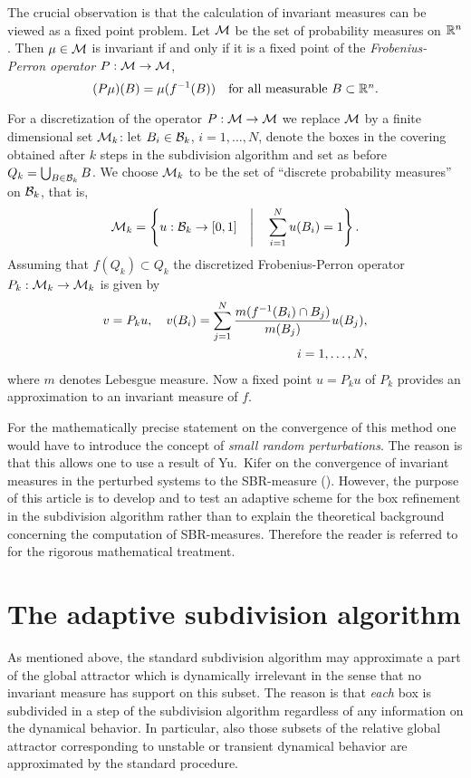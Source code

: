 \documentclass[cvs,envcountsect]{svjour}
\begin{document}
The crucial observation is that the calculation of
invariant measures can be viewed as a fixed point problem.
Let ${\cal M}$ be the set of probability measures on ${\mathbb R}^n$.
Then $\mu\in{\cal M}$ is invariant if and
only if it is a fixed point of the {\em Frobenius-Perron operator\/}
$P:{\cal M}\to {\cal M}$,
\begin{equation}
\label{eq:fp-fixed}
(P\mu)(B)=\mu(f^{-1}(B))\quad\mbox{for all measurable $B\subset{\mathbb R}^n$}.
\end{equation}

For a discretization of the operator $P:\cM\rightarrow\cM$ we
replace $\cM$ by a finite dimensional
set $\cM_k$: let $B_i\in\cB_k$, $i=1,\ldots,N$,
denote the boxes in the covering obtained after $k$ steps in the subdivision
algorithm and set as before $Q_k=\bigcup_{B\in\cB_k}B$.
We choose $\cM_k$ to be the set of ``discrete probability
measures'' on $\cB_k$, that is,
\[
\cM_k = \left\{ u:\cB_k\to [0,1] \quad\Bigg|
\quad \sum_{i=1}^N u(B_i)=1\right\}.
\]
Assuming that $f(Q_k)\subset Q_k$ the discretized
Frobenius-Perron operator $P_k:\cM_k\rightarrow\cM_k$ is given by
\begin{eqnarray}\label{eq:FP}
v= P_k u,\quad v(B_i)=\sum_{j=1}^N
\frac{m(f^{-1}(B_i)\cap B_j)}{m(B_j)}u(B_j),\\
\hfill i=1,\ldots,N,\nonumber
\end{eqnarray}
where $m$ denotes Lebesgue measure. Now a fixed point $u=P_k u$ of
$P_k$ provides an approximation to an invariant measure of $f$.
\begin{remark}
For the mathematically precise statement on the convergence of this
method one would have to introduce the concept of {\em small random
perturbations}.  The reason is that this allows one to use a result of
Yu.\ Kifer on the convergence of invariant measures in the perturbed
systems to the SBR-measure (\cite{Kifer:86}).
However, the purpose of this article is to develop and to test an adaptive
scheme for the box refinement in the subdivision algorithm rather than to
explain the theoretical background concerning the computation of
SBR-measures.  Therefore the
reader is referred to \cite{DJ:96} for the rigorous mathematical
treatment.
\end{remark}


\section{The adaptive subdivision algorithm}
\label{sec:ASA}
%
As mentioned above, the standard subdivision algorithm may approximate
a part of the global attractor which is dynamically irrelevant in the
sense that no invariant measure has support on this subset.
The reason is that {\em each\/} box is subdivided in a step of the
subdivision algorithm regardless of any information on the dynamical
behavior.  In particular, also those subsets of the relative global
attractor corresponding to unstable or transient dynamical behavior
are approximated by the standard procedure.
\end{document}
